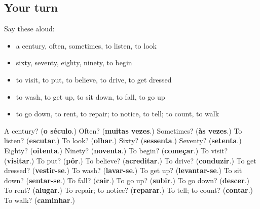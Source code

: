 \subsection*{Your turn}
Say these aloud:

\begin{itemize}
\raggedright
  \item a century, often, sometimes, to listen, to look
  \item sixty, seventy, eighty, ninety, to begin
  \item to visit, to put, to believe, to drive, to get dressed
  \item to wash, to get up, to sit down, to fall, to go up
  \item to go down, to rent, to repair; to notice, to tell; to count, to walk
\end{itemize}

\begin{tcolorbox}[breakable,colback=teal!4,colframe=teal!35!black,title={Before you move on}]
A century? (\textbf{o século}.) Often? (\textbf{muitas vezes}.) Sometimes? (\textbf{às vezes}.) To listen? (\textbf{escutar}.) To look? (\textbf{olhar}.) Sixty? (\textbf{sessenta}.) Seventy? (\textbf{setenta}.) Eighty? (\textbf{oitenta}.) Ninety? (\textbf{noventa}.) To begin? (\textbf{começar}.) To visit? (\textbf{visitar}.) To put? (\textbf{pôr}.) To believe? (\textbf{acreditar}.) To drive? (\textbf{conduzir}.) To get dressed? (\textbf{vestir-se}.) To wash? (\textbf{lavar-se}.) To get up? (\textbf{levantar-se}.) To sit down? (\textbf{sentar-se}.) To fall? (\textbf{cair}.) To go up? (\textbf{subir}.) To go down? (\textbf{descer}.) To rent? (\textbf{alugar}.) To repair; to notice? (\textbf{reparar}.) To tell; to count? (\textbf{contar}.) To walk? (\textbf{caminhar}.)
\end{tcolorbox}
